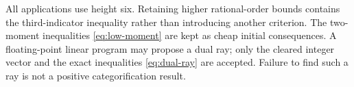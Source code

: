 All applications use height six. Retaining higher rational-order bounds
contains the third-indicator inequality rather than introducing another
criterion. The two-moment inequalities \eqref{eq:low-moment} are kept as
cheap initial consequences. A floating-point linear program may propose
a dual ray; only the cleared integer vector and the exact inequalities
\eqref{eq:dual-ray} are accepted. Failure to find such a ray is not a
positive categorification result.
